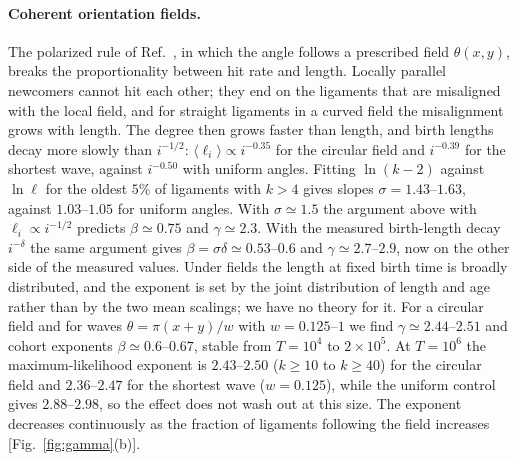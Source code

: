 \documentclass[pre,twocolumn,superscriptaddress,amsmath,amssymb,floatfix]{revtex4-2}
\begin{document}
\paragraph*{Coherent orientation fields.}
The polarized rule of Ref.~\cite{both2026}, in which the angle follows a prescribed
field $\theta(x,y)$, breaks the proportionality between hit rate and length. Locally
parallel newcomers cannot hit each other; they end on the ligaments that are misaligned
with the local field, and for straight ligaments in a curved field the misalignment
grows with length. The degree then grows faster than length, and birth lengths decay more slowly than
$i^{-1/2}$: $\langle\ell_i\rangle\propto i^{-0.35}$ for the circular field and $i^{-0.39}$
for the shortest wave, against $i^{-0.50}$ with uniform angles. Fitting
$\ln(k-2)$ against $\ln\ell$ for the oldest $5\%$ of ligaments with $k>4$ gives slopes
$\sigma=1.43$--$1.63$, against $1.03$--$1.05$ for uniform angles. With $\sigma\simeq1.5$ the
argument above with $\ell_i\propto i^{-1/2}$ predicts $\beta\simeq0.75$ and
$\gamma\simeq2.3$. With the measured birth-length decay $i^{-\delta}$ the same argument
gives $\beta=\sigma\delta\simeq0.53$--$0.6$ and $\gamma\simeq2.7$--$2.9$, now on the other side
of the measured values. Under fields the length at fixed birth time is broadly
distributed, and the exponent is set by the joint distribution of length and age rather
than by the two mean scalings; we have no theory for it. For a circular field and for waves $\theta=\pi(x+y)/w$ with
$w=0.125$--$1$ we find $\gamma\simeq2.44$--$2.51$ and cohort exponents $\beta\simeq0.6$--$0.67$,
stable from $T=10^4$ to $2\times10^5$. At $T=10^6$ the maximum-likelihood exponent is
$2.43$--$2.50$ ($k\ge10$ to $k\ge40$) for the circular field and $2.36$--$2.47$ for the
shortest wave ($w=0.125$), while the uniform control gives $2.88$--$2.98$, so the effect
does not wash out at this size. The exponent decreases continuously as the fraction of
ligaments following the field increases [Fig.~\ref{fig:gamma}(b)].

\end{document}
